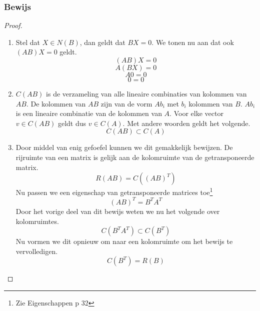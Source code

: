 \documentclass[lineaire_algebra_oplossingen.tex]{subfiles}
\begin{document}
\subsubsection*{Bewijs}
\begin{proof}
\begin{enumerate}
\item
Stel dat $X\in N(B)$, dan geldt dat $BX=0$. We tonen nu aan dat ook $(AB)X=0$ geldt.
\[(AB)X=0\]
\[A(BX)=0\]
\[A0=0\]
\[0=0\]
\item
$C(AB)$ is de verzameling van alle lineaire combinaties van kolommen van $AB$. De kolommen van $AB$ zijn van de vorm $Ab_i$ met $b_i$ kolommen van $B$. $Ab_i$ is een lineaire combinatie van de kolommen van $A$. Voor elke vector $v \in C(AB)$ geldt dus $v\in C(A)$. Met andere woorden geldt het volgende.
\[C(AB) \subset C(A)\]
\item
Door middel van enig gefoefel kunnen we dit gemakkelijk bewijzen.
De rijruimte van een matrix is gelijk aan de kolomruimte van de getransponeerde matrix.
\[
R(AB) = C((AB)^T)
\]
Nu passen we een eigenschap van getransponeerde matrices toe\footnote{Zie Eigenschappen p 32}
\[
(AB)^T = B^TA^T
\]
Door het vorige deel van dit bewijs weten we nu het volgende over kolomruimtes.
\[
C(B^TA^T) \subset C(B^T)
\]
Nu vormen we dit opnieuw om naar een kolomruimte om het bewijs te vervolledigen.
\[
C(B^T) = R(B)
\]
\end{enumerate}
\end{proof}
\end{document}
